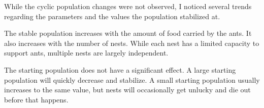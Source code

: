 \documentclass{article}
\begin{document}
While the cyclic population changes were not observed, I noticed several trends regarding the parameters and the values the population stabilized at.

The stable population increases with the amount of food carried by the ants.  It also increases with the number of nests.  While each nest has a limited capacity to support ants, multiple nests are largely independent.

The starting population does not have a significant effect.  A large starting population will quickly decrease and stabilize.  A small starting population usually increases to the same value, but nests will occasionally get unlucky and die out before that happens.
\end{document}
